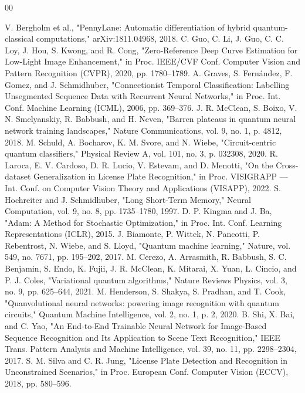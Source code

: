 \documentclass[preprint,12pt]{elsarticle}
\begin{document}
\begin{thebibliography}{00}

 V. Bergholm et al., "PennyLane: Automatic differentiation of hybrid quantum-classical computations," arXiv:1811.04968, 2018.
 C. Guo, C. Li, J. Guo, C. C. Loy, J. Hou, S. Kwong, and R. Cong, "Zero-Reference Deep Curve Estimation for Low-Light Image Enhancement," in Proc. IEEE/CVF Conf. Computer Vision and Pattern Recognition (CVPR), 2020, pp. 1780--1789.
 A. Graves, S. Fernández, F. Gomez, and J. Schmidhuber, "Connectionist Temporal Classification: Labelling Unsegmented Sequence Data with Recurrent Neural Networks," in Proc. Int. Conf. Machine Learning (ICML), 2006, pp. 369--376.
 J. R. McClean, S. Boixo, V. N. Smelyanskiy, R. Babbush, and H. Neven, "Barren plateaus in quantum neural network training landscapes," Nature Communications, vol. 9, no. 1, p. 4812, 2018.
 M. Schuld, A. Bocharov, K. M. Svore, and N. Wiebe, "Circuit-centric quantum classifiers," Physical Review A, vol. 101, no. 3, p. 032308, 2020.
 R. Laroca, E. V. Cardoso, D. R. Lucio, V. Estevam, and D. Menotti, "On the Cross-dataset Generalization in License Plate Recognition," in Proc. VISIGRAPP — Int. Conf. on Computer Vision Theory and Applications (VISAPP), 2022.
 S. Hochreiter and J. Schmidhuber, "Long Short-Term Memory," Neural Computation, vol. 9, no. 8, pp. 1735--1780, 1997.
 D. P. Kingma and J. Ba, "Adam: A Method for Stochastic Optimization," in Proc. Int. Conf. Learning Representations (ICLR), 2015.
 J. Biamonte, P. Wittek, N. Pancotti, P. Rebentrost, N. Wiebe, and S. Lloyd, "Quantum machine learning," Nature, vol. 549, no. 7671, pp. 195--202, 2017.
 M. Cerezo, A. Arrasmith, R. Babbush, S. C. Benjamin, S. Endo, K. Fujii, J. R. McClean, K. Mitarai, X. Yuan, L. Cincio, and P. J. Coles, "Variational quantum algorithms," Nature Reviews Physics, vol. 3, no. 9, pp. 625--644, 2021.
 M. Henderson, S. Shakya, S. Pradhan, and T. Cook, "Quanvolutional neural networks: powering image recognition with quantum circuits," Quantum Machine Intelligence, vol. 2, no. 1, p. 2, 2020.
 B. Shi, X. Bai, and C. Yao, "An End-to-End Trainable Neural Network for Image-Based Sequence Recognition and Its Application to Scene Text Recognition," IEEE Trans. Pattern Analysis and Machine Intelligence, vol. 39, no. 11, pp. 2298--2304, 2017.
 S. M. Silva and C. R. Jung, "License Plate Detection and Recognition in Unconstrained Scenarios," in Proc. European Conf. Computer Vision (ECCV), 2018, pp. 580--596.

\end{thebibliography}
\end{document}
